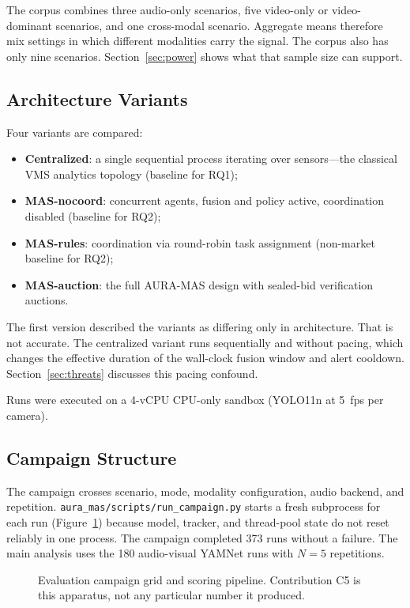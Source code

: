 The corpus combines three audio-only scenarios, five video-only or video-dominant scenarios, and one cross-modal scenario. Aggregate means therefore mix settings in which different modalities carry the signal. The corpus also has only nine scenarios. Section~\ref{sec:power} shows what that sample size can support.

\subsection{Architecture Variants}

Four variants are compared:

\begin{itemize}
	\item \textbf{Centralized}: a single sequential process iterating over sensors---the classical VMS analytics topology (baseline for RQ1);
	\item \textbf{MAS-nocoord}: concurrent agents, fusion and policy active, coordination disabled (baseline for RQ2);
	\item \textbf{MAS-rules}: coordination via round-robin task assignment (non-market baseline for RQ2);
	\item \textbf{MAS-auction}: the full AURA-MAS design with sealed-bid verification auctions.
\end{itemize}

The first version described the variants as differing only in architecture. That is not accurate. The centralized variant runs sequentially and without pacing, which changes the effective duration of the wall-clock fusion window and alert cooldown. Section~\ref{sec:threats} discusses this pacing confound.

Runs were executed on a 4-vCPU CPU-only sandbox (YOLO11n at 5~\gls{fps} per camera).

\subsection{Campaign Structure}

The campaign crosses scenario, mode, modality configuration, audio backend, and repetition. \texttt{aura\_mas/scripts/run\_campaign.py} starts a fresh subprocess for each run (Figure~\ref{fig:campaign_grid}) because model, tracker, and thread-pool state do not reset reliably in one process. The campaign completed 373 runs without a failure. The main analysis uses the 180 audio-visual YAMNet runs with $N=5$ repetitions.

\begin{figure}[H]
	\centering
	\resizebox{\textwidth}{!}{}
	\caption{Evaluation campaign grid and scoring pipeline. Contribution C5 is this apparatus, not any particular number it produced.}
	\label{fig:campaign_grid}
\end{figure}

